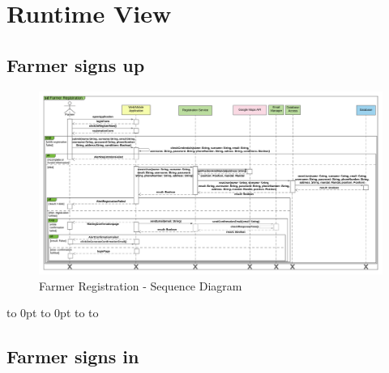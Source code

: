 \section{Runtime View}

\subsection{Farmer signs up}


\def\fillandplacepagenumber{%
 \par\pagestyle{empty}%
\vbox to 0pt{\vss}\vfill
\vbox to 0pt{\baselineskip0pt
   \hbox to\linewidth{\hss}%
   \setlength{\footskip}{70pt}
   \baselineskip\footskip
   \hbox to\linewidth{%
     \hfil\thepage\hfil}\vss}}

\newpage
\begin{landscape}
\begin{figure}[h]
\vspace*{-2cm}
\noindent
\centering
\centerline{\includegraphics[scale= 0.108]{./Images/Sequence diagram/Farmer Registration Sequence Diagram.png}}
    \caption{Farmer Registration - Sequence Diagram}
    \vspace*{-12cm}
\end{figure}
\fillandplacepagenumber
\end{landscape}

\subsection{Farmer signs in}

